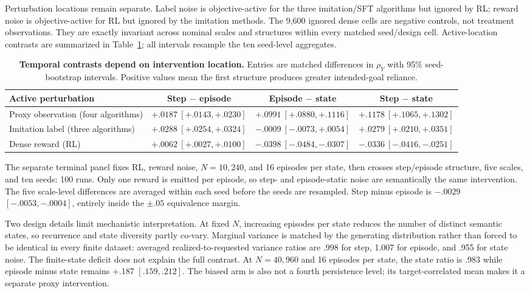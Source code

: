 \documentclass[11pt,a4paper]{article}
\newcommand{\rhoY}{\rho_Y}
\newcommand{\tbl}[1]{Table~\ref{#1}}
\begin{document}
Perturbation locations remain separate. Label noise is objective-active for the three imitation/SFT algorithms but ignored by RL; reward noise is objective-active for RL but ignored by the imitation methods. The 9,600 ignored dense cells are negative controls, not treatment observations. They are exactly invariant across nominal scales and structures within every matched seed/design cell. Active-location contrasts are summarized in \tbl{tab:h6-locations}; all intervals resample the ten seed-level aggregates.

\begin{table}[h]
\centering
\caption{\textbf{Temporal contrasts depend on intervention location.} Entries are matched differences in $\rhoY$ with 95\% seed-bootstrap intervals. Positive values mean the first structure produces greater intended-goal reliance.}
\label{tab:h6-locations}
\begin{adjustbox}{max width=\linewidth}
\begin{tabular}{lccc}
\toprule
Active perturbation & Step $-$ episode & Episode $-$ state & Step $-$ state \\
\midrule
Proxy observation (four algorithms) & $+.0187\ [+.0143,+.0230]$ & $+.0991\ [+.0880,+.1116]$ & $+.1178\ [+.1065,+.1302]$ \\
Imitation label (three algorithms) & $+.0288\ [+.0254,+.0324]$ & $-.0009\ [-.0073,+.0054]$ & $+.0279\ [+.0210,+.0351]$ \\
Dense reward (RL) & $+.0062\ [+.0027,+.0100]$ & $-.0398\ [-.0484,-.0307]$ & $-.0336\ [-.0416,-.0251]$ \\
\bottomrule
\end{tabular}
\end{adjustbox}
\end{table}

The separate terminal panel fixes RL, reward noise, $N=10{,}240$, and 16 episodes per state, then crosses step/episode structure, five scales, and ten seeds: 100 runs. Only one reward is emitted per episode, so step- and episode-static noise are semantically the same intervention. The five scale-level differences are averaged within each seed before the seeds are resampled. Step minus episode is $-.0029$ $[-.0053,-.0004]$, entirely inside the $\pm.05$ equivalence margin.

Two design details limit mechanistic interpretation. At fixed $N$, increasing episodes per state reduces the number of distinct semantic states, so recurrence and state diversity partly co-vary. Marginal variance is matched by the generating distribution rather than forced to be identical in every finite dataset: averaged realized-to-requested variance ratios are .998 for step, 1.007 for episode, and .955 for state noise. The finite-state deficit does not explain the full contrast. At $N=40{,}960$ and 16 episodes per state, the state ratio is .983 while episode minus state remains +.187 $[.159,.212]$. The biased arm is also not a fourth persistence level; its target-correlated mean makes it a separate proxy intervention.
\end{document}
